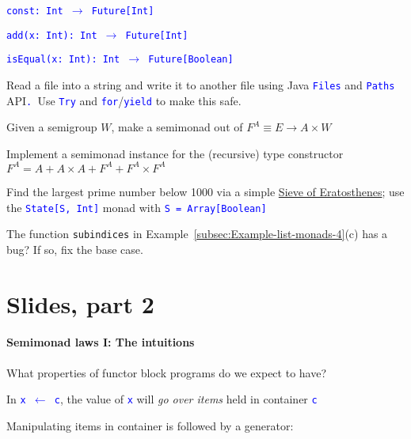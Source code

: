 \texttt{\textcolor{blue}{\footnotesize{}const: Int $\rightarrow$
Future{[}Int{]}}}{\footnotesize\par}

\texttt{\textcolor{blue}{\footnotesize{}add(x: Int): Int $\rightarrow$
Future{[}Int{]}}}{\footnotesize\par}

\texttt{\textcolor{blue}{\footnotesize{}isEqual(x: Int): Int $\rightarrow$
Future{[}Boolean{]} }}{\footnotesize\par}

Read a file into a string and write it to another file using Java
\texttt{\textcolor{blue}{\footnotesize{}Files}} and \texttt{\textcolor{blue}{\footnotesize{}Paths}}
API\texttt{\textcolor{blue}{\footnotesize{}. }}Use \texttt{\textcolor{blue}{\footnotesize{}Try}}
and \texttt{\textcolor{blue}{\footnotesize{}for}}/\texttt{\textcolor{blue}{\footnotesize{}yield}}
to make this safe.

Given a semigroup $W$, make a semimonad out of $F^{A}\equiv E\rightarrow A\times W$ 

Implement a semimonad instance for the (recursive) type constructor
$F^{A}=A+A\times A+F^{A}+F^{A}\times F^{A}$

Find the largest prime number below 1000 via a simple \href{https://en.wikipedia.org/wiki/Sieve_of_Eratosthenes}{Sieve of Eratosthenes};
use the \texttt{\textcolor{blue}{\footnotesize{}State{[}S, Int{]}}}
monad with \texttt{\textcolor{blue}{\footnotesize{}S = Array{[}Boolean{]}}} 

The function \lstinline!subindices! in Example~\ref{subsec:Example-list-monads-4}(c)
has a bug? If so, fix the base case.

\section{Slides, part 2}

\paragraph{Semimonad laws I: The intuitions}

What properties of functor block programs do we expect to have?

In \texttt{\textcolor{blue}{\footnotesize{}x $\leftarrow$ c}}, the
value of \texttt{\textcolor{blue}{\footnotesize{}x}} will \emph{go
over items} held in container \texttt{\textcolor{blue}{\footnotesize{}c}} 

Manipulating items in container is followed by a generator:

